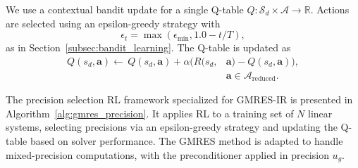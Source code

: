\documentclass[Afour,sageh,times]{sagej}
\theoremstyle{plain}
\theoremstyle{definition}
\begin{document}
We use a contextual bandit update for a single Q-table $Q: \mathcal{S}_d \times \mathcal{A} \to \mathbb{R}$. Actions are selected using an epsilon-greedy strategy with
\begin{equation}
\epsilon_t = \max(\epsilon_{\text{min}}, 1.0 - t / T),
\end{equation}
as in Section~\ref{subsec:bandit_learning}. The Q-table is updated as
\begin{equation}
\begin{aligned}
Q(s_d, \mathbf{a}) \leftarrow
\, Q(s_d, \mathbf{a}) + \alpha \Big( R(s_d, &\mathbf{a}) - Q(s_d, \mathbf{a}) \Big), \\
&\mathbf{a} \in \mathcal{A}_{\text{reduced}}.
\end{aligned}
\end{equation}



The precision selection RL framework specialized for GMRES-IR is presented in Algorithm~\ref{alg:gmres_precision}. It applies RL to a training set of $N$ linear systems, selecting precisions via an epsilon-greedy strategy and updating the Q-table based on solver performance. The GMRES method is adapted to handle mixed-precision computations, with the preconditioner applied in precision $u_g$.
\end{document}
